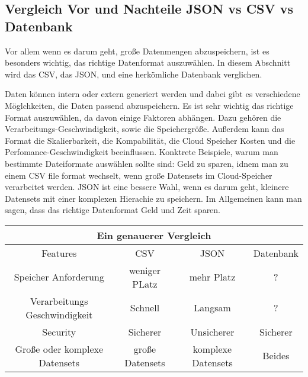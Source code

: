 \subsection{Vergleich Vor und Nachteile JSON vs CSV vs Datenbank}
Vor allem wenn es darum geht, große Datenmengen abzuspeichern, ist es besonders wichtig, das richtige Datenformat auszuwählen. In diesem Abschnitt wird das CSV, das JSON, und eine herkömliche Datenbank verglichen. 

Daten können intern oder extern generiert werden und dabei gibt es verschiedene Möglchkeiten, die Daten passend abzuspeichern. Es ist sehr wichtig das richtige Format auszuwählen, da davon einige Faktoren abhängen. Dazu gehören die Verarbeitungs-Geschwindigkeit, sowie die Speichergröße. 
Außerdem kann das Format die Skalierbarkeit, die Kompabilität, die Cloud Speicher Kosten und die Perfomance-Geschwindigkeit beeinflussen. 
Konktrete Beispiele, warum man bestimmte Dateiformate auswählen sollte sind: Geld zu sparen, idnem man zu einem CSV file format wechselt, wenn große Datensets im Cloud-Speicher verarbeitet werden. JSON ist eine bessere Wahl, wenn es darum geht, kleinere Datensets mit einer komplexen Hierachie zu speichern. 
Im Allgemeinen kann man sagen, dass das richtige Datenformat Geld und Zeit sparen.  

\begin{center}
    \begin{tabular}{ |c|c|c|c| } 
     \hline
     \multicolumn{4}{|c|}{Ein genauerer Vergleich } \\
     \hline
     \hline
     Features & CSV & JSON & Datenbank \\ 
     \hline 
     \hline
     Speicher Anforderung & weniger PLatz & mehr Platz & ? \\ 
     \hline
     Verarbeitungs Geschwindigkeit & Schnell & Langsam & ? \\ 
     \hline
     Security & Sicherer & Unsicherer & Sicherer \\ 
     \hline
     Große oder komplexe Datensets & große Datensets & komplexe Datensets & Beides \\ 
     \hline
    \end{tabular}
    \end{center}

